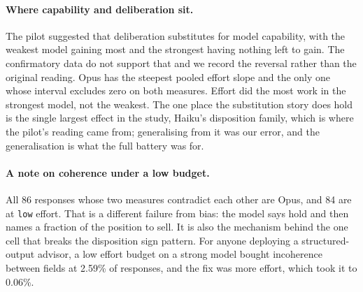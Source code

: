 \label{sec:discnotes}\label{app:discnotes}
\paragraph{Where capability and deliberation sit.} The pilot suggested that
deliberation substitutes for model capability, with the weakest model gaining
most and the strongest having nothing left to gain. The confirmatory data do
not support that and we record the reversal rather than the original
reading. Opus has the steepest pooled effort slope and the only one whose
interval excludes zero on both measures. Effort did the most work in the
strongest model, not the weakest. The one place the substitution story does
hold is the single largest effect in the study, Haiku's disposition family,
which is where the pilot's reading came from; generalising from it was our
error, and the generalisation is what the full battery was for.

\paragraph{A note on coherence under a low budget.} All 86 responses whose
two measures contradict each other are Opus, and 84 are at \texttt{low}
effort. That is a different failure from bias: the model says hold and then
names a fraction of the position to sell. It is also the mechanism behind the
one cell that breaks the disposition sign pattern. For anyone deploying a
structured-output advisor, a low effort budget on a strong model bought
incoherence between fields at 2.59\% of responses, and the fix was more
effort, which took it to 0.06\%.
